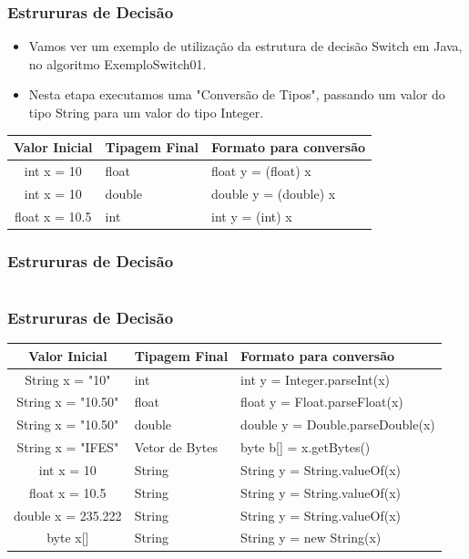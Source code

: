 \documentclass{beamer}
\begin{document}
\begin{frame}
	\frametitle{Estrururas de Decisão}
	\begin{itemize}
		\item Vamos ver um exemplo de utilização da estrutura de decisão Switch em Java, no algoritmo ExemploSwitch01.
		\item Nesta etapa executamos uma "Conversão de Tipos", passando um valor do tipo String para um valor do tipo Integer.
	\end{itemize}
	\begin{table}
		\begin{tabular}{cl l}
			\toprule
			\textbf{Valor Inicial} & \textbf{Tipagem Final} & \textbf{Formato para conversão} \\
			\midrule
			int x = 10 & float & float y = (float) x  \\
			int x = 10 & double & double y = (double) x  \\
			float x = 10.5 & int & int y = (int) x  \\
			\bottomrule
		\end{tabular}
	\end{table}
\end{frame}
\begin{frame}
	\frametitle{Estrururas de Decisão}
	\inputminted[tabsize=1, fontsize=\footnotesize]{java}{codigos/ExemploSwitch01.java}
\end{frame}
\begin{frame}
	\frametitle{Estrururas de Decisão}
	\begin{table}
		\begin{tabular}{cl l}
			\toprule
			\textbf{Valor Inicial} & \textbf{Tipagem Final} & \textbf{Formato para conversão} \\
			\midrule
			String x = "10" & int & int y = Integer.parseInt(x)  \\
			String x = "10.50" & float & float y = Float.parseFloat(x)  \\
			String x = "10.50" & double & double y = Double.parseDouble(x)  \\
			String x = "IFES" & Vetor de Bytes & byte b[] = x.getBytes()  \\
			int x = 10 & String & String y = String.valueOf(x) \\
			float x = 10.5 & String & String y = String.valueOf(x) \\
			double x = 235.222 & String & String y = String.valueOf(x) \\
			byte x[] & String & String y = new String(x) \\
			\bottomrule
		\end{tabular}
	\end{table}
\end{frame}
\end{document}
